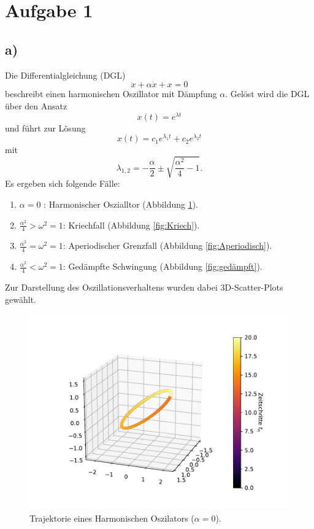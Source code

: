 \section*{Aufgabe 1}
\subsection*{a)}
Die Differentialgleichung (DGL) 
\begin{equation}
    \ddot{x} + \alpha \dot{x} + x = 0
\end{equation}
beschreibt einen harmonischen Oszillator mit Dämpfung $\alpha$.
Gelöst wird die DGL über den Ansatz 
\begin{equation}
    x(t) = e^{\lambda t}
\end{equation}
und führt zur Lösung 
\begin{equation}
    x(t) = c_1 e^{\lambda_1 t} + c_2 e^{\lambda_2 t}
\end{equation}
mit 
\begin{equation}
    \lambda_{1,2} = - \frac{\alpha}{2} \pm \sqrt{ \frac{\alpha^2}{4} -1 }.
\end{equation}
Es ergeben sich folgende Fälle:
\begin{enumerate}
    \item $\alpha = 0$ : Harmonischer Oszialltor (Abbildung \ref{fig:harmonisch}).
    \item $\frac{\alpha^2}{4} > \omega^2 = 1$: Kriechfall (Abbildung \ref{fig:Kriech}).
    \item $\frac{\alpha^2}{4} = \omega^2 = 1$: Aperiodischer Grenzfall (Abbildung \ref{fig:Aperiodisch}).
    \item $\frac{\alpha^2}{4} < \omega^2 = 1$: Gedämpfte Schwingung (Abbildung \ref{fig:gedämpft}).
\end{enumerate}
Zur Darstellung des Oszillationsverhaltens wurden dabei 3D-Scatter-Plots gewählt.
\begin{figure}
  \centering
  \includegraphics[scale=0.7]{A2/plots/aufg1_a1.pdf}
  \caption{Trajektorie eines Harmonischen Oszilators ($\alpha = 0$).}
  \label{fig:harmonisch}
\end{figure}

